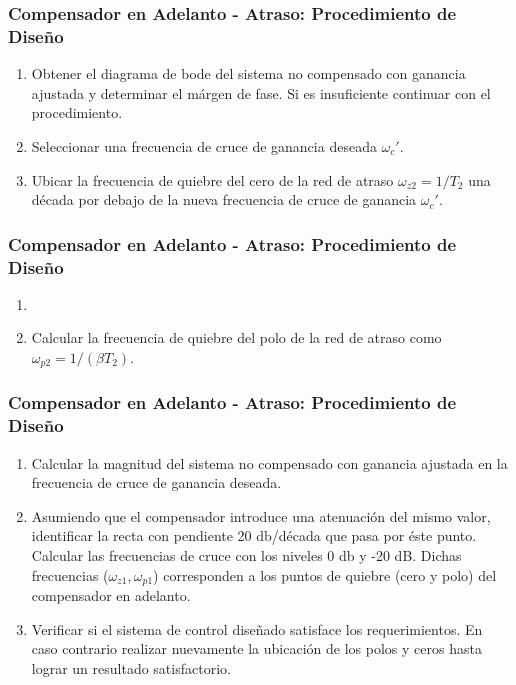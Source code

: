 \documentclass[aspectratio=169,handout]{beamer}
\theoremstyle{definition}
\theoremstyle{plain}
\theoremstyle{remark}
\newcounter{saveenumi}
\newcommand{\seti}{\setcounter{saveenumi}{\value{enumi}}}
\newcommand{\conti}{\setcounter{enumi}{\value{saveenumi}}}
\begin{document}
\begin{frame}[<+->]\frametitle{Compensador en Adelanto - Atraso: Procedimiento de Diseño}
	\begin{enumerate}
		\conti
		\item Obtener el diagrama de bode del sistema no compensado con ganancia ajustada y determinar el márgen de fase. Si es insuficiente continuar con el procedimiento.
		\item Seleccionar una frecuencia de cruce de ganancia deseada $\omega_c'$.
		\item Ubicar la frecuencia de quiebre del cero de la red de atraso $\omega_{z2} = 1/T_2$ una década por debajo de la nueva frecuencia de cruce de ganancia $\omega_c'$.
		\seti
	\end{enumerate}		
\end{frame}

\begin{frame}[c]\frametitle{Compensador en Adelanto - Atraso: Procedimiento de Diseño}
	\begin{enumerate}
		\conti
		\item {}
		\item<4-> Calcular la frecuencia de quiebre del polo de la red de atraso como $\omega_{p2} = 1/(\beta T_2)$.
		\seti
	\end{enumerate}		
\end{frame}

\begin{frame}[<+->]\frametitle{Compensador en Adelanto - Atraso: Procedimiento de Diseño}
	\begin{enumerate}
		\conti
		\item Calcular la magnitud del sistema no compensado con ganancia ajustada en la frecuencia de cruce de ganancia deseada.
		\item Asumiendo que el compensador introduce una atenuación del mismo valor, identificar la recta con pendiente 20 db/década que pasa por éste punto. Calcular las frecuencias de cruce con los niveles 0 db y -20 dB. Dichas frecuencias ($\omega_{z1}, \omega_{p1}$) corresponden a los puntos de quiebre (cero y polo) del compensador en adelanto.
		\item Verificar si el sistema de control diseñado satisface los requerimientos. En caso contrario realizar nuevamente la ubicación de los polos y ceros hasta lograr un resultado satisfactorio.
	\end{enumerate}		
\end{frame}
\end{document}
